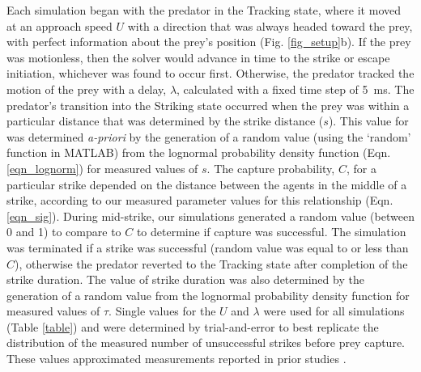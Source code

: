 \documentclass[]{rsos}%
\begin{document}
Each simulation began with the predator in the Tracking state, where it moved at an approach speed $U$ with a direction that was always headed toward the prey, with perfect information about the prey's position (Fig. \ref{fig_setup}b). 
If the prey was motionless, then the solver would advance in time to the strike or escape initiation, whichever was found to occur first.
Otherwise, the predator tracked the motion of the prey with a delay, $\lambda$, calculated with a fixed time step of \SI{5}{\ms}.  
The predator's transition into the Striking state occurred when the prey was within a particular distance that was determined by the strike distance ($s$). 
This value for was determined \textit{a-priori} by the generation of a random value (using the `random' function in MATLAB) from the lognormal probability density function (Eqn. \ref{eqn_lognorm}) for measured values of $s$.
The capture probability, $C$, for a particular strike depended on the distance between the agents in the middle of a strike, according to our measured parameter values for this relationship (Eqn. \ref{eqn_sig}).
During mid-strike, our simulations generated a random value (between 0 and 1) to compare to $C$ to determine if capture was successful.
The simulation was terminated if a strike was successful (random value was equal to or less than $C$), otherwise the predator reverted to the Tracking state after completion of the strike duration.
The value of strike duration was also determined by the generation of a random value from the lognormal probability density function for measured values of $\tau$.
Single values for the $U$ and $\lambda$ were used for all simulations (Table \ref{table}) and were determined by trial-and-error to best replicate the distribution of the measured number of unsuccessful strikes before prey capture. 
These values approximated measurements reported in prior studies \cite{McHenry:2005tc, Stewart:2013bha}. 
\end{document}
